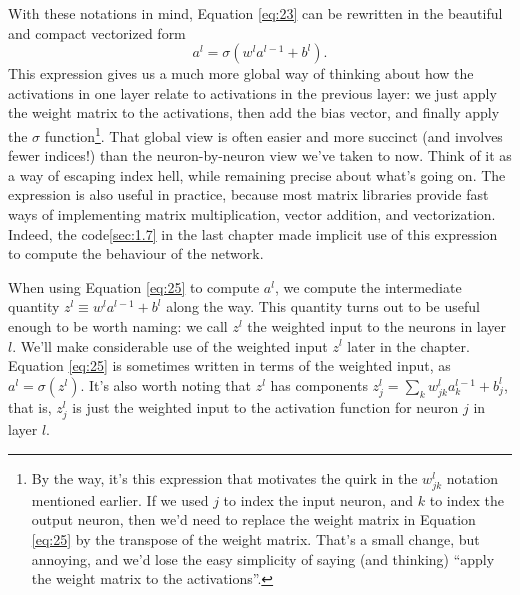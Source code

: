 \documentclass[a4paper,twoside,10pt]{book}
\begin{document}
With these notations in mind, Equation \ref{eq:23} can be rewritten in the beautiful and compact vectorized form
\begin{equation}
a^{l} = \sigma(w^l a^{l-1}+b^l).
\label{eq:25}
\end{equation}
This expression gives us a much more global way of thinking about how the activations in one layer relate to activations in the previous layer: we just apply the weight matrix to the activations, then add the bias vector, and finally apply the $\sigma$ function\footnote{By the way, it's this expression that motivates the quirk in the $w^l_{jk}$ notation mentioned earlier. If we used $j$ to index the input neuron, and $k$ to index the output neuron, then we'd need to replace the weight matrix in Equation \ref{eq:25} by the transpose of the weight matrix. That's a small change, but annoying, and we'd lose the easy simplicity of saying (and thinking) ``apply the weight matrix to the activations''.}. That global view is often easier and more succinct (and involves fewer indices!) than the neuron-by-neuron view we've taken to now. Think of it as a way of escaping index hell, while remaining precise about what's going on. The expression is also useful in practice, because most matrix libraries provide fast ways of implementing matrix multiplication, vector addition, and vectorization. Indeed, the code\ref{sec:1.7} in the last chapter made implicit use of this expression to compute the behaviour of the network.

When using Equation \ref{eq:25} to compute $a^l$, we compute the intermediate quantity $z^l \equiv w^l a^{l-1}+b^l$ along the way. This quantity turns out to be useful enough to be worth naming: we call $z^l$ the weighted input to the neurons in layer $l$. We'll make considerable use of the weighted input $z^l$ later in the chapter. Equation \ref{eq:25} is sometimes written in terms of the weighted input, as $a^l=\sigma(z^l)$. It's also worth noting that $z^l$ has components $z^l_j= \sum_k w^l_{jk} a^{l-1}_k+b^l_j$, that is, $z^l_j$ is just the weighted input to the activation function for neuron $j$ in layer $l$.
\end{document}

